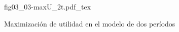 \begin{figure}[h]
\centering
\def\svgwidth{0.5\textwidth}
{fig03_03-maxU_2t.pdf_tex}
\caption{Maximización de utilidad en el modelo de dos períodos}
\label{fig03_03-maxU_2t}
\end{figure}